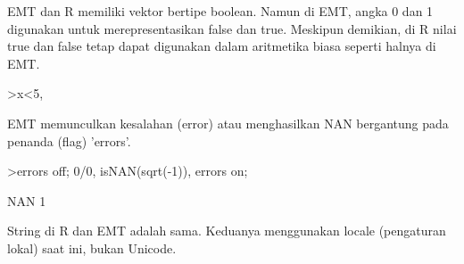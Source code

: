 \documentclass{article}
\newenvironment{eulernotebook}{\par}{\par}
\newenvironment{eulercomment}{\par\medskip}{\par\medskip}
\begin{document}
\begin{eulernotebook}
\begin{eulercomment}
\begin{eulercomment}
\begin{eulercomment}
\begin{eulercomment}
\begin{eulercomment}
EMT dan R memiliki vektor bertipe boolean. Namun di EMT, angka 0 dan 1
digunakan untuk merepresentasikan false dan true. Meskipun demikian,
di R nilai true dan false tetap dapat digunakan dalam aritmetika biasa
seperti halnya di EMT.
\end{eulercomment}
\begin{eulerprompt}
>x<5, %
\end{eulerprompt}
\begin{euleroutput}
  [0,  0,  1,  0,  0]
  [0,  0,  3.1,  0,  0]
\end{euleroutput}
\begin{eulercomment}
EMT memunculkan kesalahan (error) atau menghasilkan NAN bergantung
pada penanda (flag) 'errors'.
\end{eulercomment}
\begin{eulerprompt}
>errors off; 0/0, isNAN(sqrt(-1)), errors on;
\end{eulerprompt}
\begin{euleroutput}
  NAN
  1
\end{euleroutput}
\begin{eulercomment}
String di R dan EMT adalah sama. Keduanya menggunakan locale
(pengaturan lokal) saat ini, bukan Unicode.


\end{eulercomment}
\end{eulercomment}
\end{eulercomment}
\end{eulercomment}
\end{eulercomment}
\end{eulernotebook}
\end{document}
